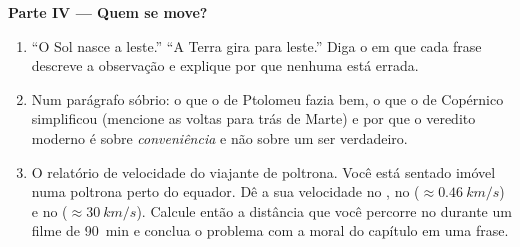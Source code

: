 \begin{problem}
\medskip
\noindent\textbf{Parte IV --- Quem se move?}
\begin{enumerate}[resume]
  \item ``O Sol nasce a leste.'' ``A Terra gira para leste.'' Diga o
         em que cada frase descreve a observação e explique
        por que nenhuma está errada.
  \item Num parágrafo sóbrio: o que o  de Ptolomeu fazia bem,
        o que o  de Copérnico simplificou (mencione as voltas
        para trás de Marte) e por que o veredito moderno é sobre
        \emph{conveniência} e não sobre um  ser verdadeiro.
  \item O relatório de velocidade do viajante de poltrona. Você está
        sentado imóvel numa poltrona perto do equador. Dê a sua
        velocidade no , no 
        ($\approx \qty{0.46}{km/s}$) e no 
        ($\approx \qty{30}{km/s}$). Calcule então a distância que você
        percorre no  durante um filme de
        \qty{90}{min} e conclua o problema com a moral do capítulo em uma
        frase.
\end{enumerate}
\end{problem}
